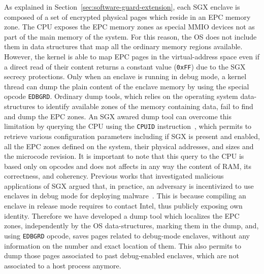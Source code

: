 As explained in Section~\ref{sec:software-guard-extension}, each SGX enclave is 
composed of a set of encrypted physical pages which reside in an EPC memory 
zone. The CPU exposes the EPC memory zones as special MMIO devices not as part 
of the main memory of the system. For this reason, the OS does not include them 
in data structures that map all the ordinary memory regions available. However, 
the kernel is able to map EPC pages in the virtual-address space even if a 
direct read of their content returns a constant value (\ie \texttt{0xFF}) due 
to the SGX secrecy protections. Only when an enclave is running in debug mode, 
a kernel thread can dump the plain content of the enclave memory by using the 
special opcode \texttt{EDBGRD}. Ordinary dump tools, which relies on the 
operating system data-structures to identify available zones of the memory 
containing data, fail to find and dump the EPC zones. An SGX awared dump tool 
can overcome this limitation by querying
the CPU using the \texttt{CPUID} instruction~\citep{intel-developer-guide}, 
which permits to retrieve various configuration parameters including if SGX is 
present and enabled, all the EPC zones
defined on the system, their physical addresses, and sizes and the microcode
revision. It is important to note that this query to the CPU is based only on
opcodes and does not affects in any way the content of RAM, its
correctness, and coherency. 
Previous works that investigated malicious applications of SGX argued that, in 
practice, an adversary is incentivized to use enclaves in debug mode for 
deploying malware~\citep{zhang2018memory}.
This is because compiling an enclave in release mode requires to contact 
Intel, thus publicly exposing own identity.
Therefore we have developed a dump
tool which localizes the EPC zones, independently by the OS data-structures, 
marking them in the dump, and,
using \texttt{EDBGRD} opcode, saves pages related to debug-mode enclaves, 
without any information
on the number and exact location of them. This also permits to dump those
pages associated to past debug-enabled enclaves, which are not associated 
to a host process anymore.


